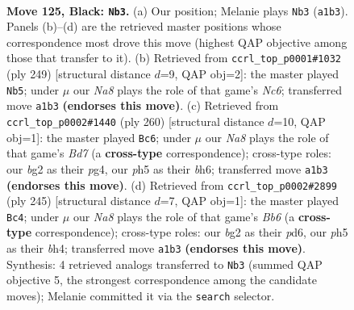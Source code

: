 \documentclass[11pt]{article}
\begin{document}
\clearpage

\begin{figure}[p]\centering
\begin{subfigure}{0.46\textwidth}\centering
\resizebox{\linewidth}{!}{%
\newchessgame
\chessboard[
  setfen={8/5k2/8/6PP/8/8/6BK/n7 b - - 20 125},
  showmover=false,
  pgfstyle=straightmove, color=movearrow, markmove={a1-b3}
]}
\caption{}
\end{subfigure}\hfill
\begin{subfigure}{0.46\textwidth}\centering
\resizebox{\linewidth}{!}{%
\newchessgame
\chessboard[
  setfen={8/6k1/5p2/5P2/7P/2n1BK2/8/8 b - - 54 125},
  showmover=false,
  pgfstyle=straightmove, color=movearrow, markmove={c3-b5}
]}
\caption{}
\end{subfigure}
\\[4pt]
\begin{subfigure}{0.46\textwidth}\centering
\resizebox{\linewidth}{!}{%
\newchessgame
\chessboard[
  setfen={8/3B4/7b/8/3p2pk/8/4K3/8 w - - 54 131},
  showmover=false,
  pgfstyle=straightmove, color=movearrow, markmove={d7-c6}
]}
\caption{}
\end{subfigure}\hfill
\begin{subfigure}{0.46\textwidth}\centering
\resizebox{\linewidth}{!}{%
\newchessgame
\chessboard[
  setfen={2k5/6P1/3P4/4K3/7B/1b6/8/8 b - - 30 123},
  showmover=false,
  pgfstyle=straightmove, color=movearrow, markmove={b3-c4}
]}
\caption{}
\end{subfigure}
\caption{\textbf{Move 125, Black: \texttt{Nb3}.} (a) Our position; Melanie plays \texttt{Nb3} (\texttt{a1b3}). Panels (b)--(d) are the retrieved master positions whose correspondence most drove this move (highest QAP objective among those that transfer to it). (b) Retrieved from \texttt{ccrl\_top\_p0001\#1032} (ply 249) [structural distance $d$=9, QAP obj=2]: the master played \texttt{Nb5}; under $\mu$ our \emph{Na8} plays the role of that game's \emph{Nc6}; transferred move \texttt{a1b3} \textbf{(endorses this move)}. (c) Retrieved from \texttt{ccrl\_top\_p0002\#1440} (ply 260) [structural distance $d$=10, QAP obj=1]: the master played \texttt{Bc6}; under $\mu$ our \emph{Na8} plays the role of that game's \emph{Bd7} (a \textbf{cross-type} correspondence); cross-type roles: our \emph{b}g2 as their \emph{p}g4, our \emph{p}h5 as their \emph{b}h6; transferred move \texttt{a1b3} \textbf{(endorses this move)}. (d) Retrieved from \texttt{ccrl\_top\_p0002\#2899} (ply 245) [structural distance $d$=7, QAP obj=1]: the master played \texttt{Bc4}; under $\mu$ our \emph{Na8} plays the role of that game's \emph{Bb6} (a \textbf{cross-type} correspondence); cross-type roles: our \emph{b}g2 as their \emph{p}d6, our \emph{p}h5 as their \emph{b}h4; transferred move \texttt{a1b3} \textbf{(endorses this move)}. Synthesis: 4 retrieved analogs transferred to \texttt{Nb3} (summed QAP objective 5, the strongest correspondence among the candidate moves); Melanie committed it via the \texttt{search} selector.}
\label{fig:thought-m249}
\end{figure}
\end{document}
